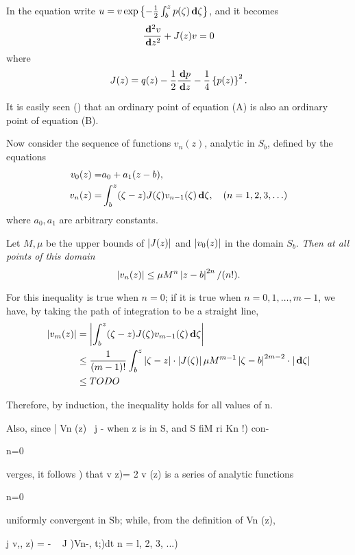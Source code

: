 In the equation write
$u = v \exp \left\{ 
  - \frac{1}{2} \int_{b}^{z} p(\zeta) \, \mathbf{d} \zeta
 \right\}$,
and it becomes
\begin{equation}
  \frac{\, \mathbf{d}^{2} v}{\, \mathbf{d} z^{2}}
  + J(z) v
  = 0
\end{equation}
where
$$
J(z)
=
q(z)
- \frac{1}{2} \frac{\, \mathbf{d} p}{\, \mathbf{d} z}
- \frac{1}{4} \left\{ p(z) \right\}^{2}.
$$
%
%

It is easily seen () that an ordinary point of equation (A) %
is also an ordinary point of equation (B). %

Now consider the sequence of functions $v_{n}(z)$, analytic in $S_{b}$,
defined by the equations
\begin{align*}
  v_{0}(z)
  =& a_{0} + a_{1} (z-b),
  \\
  v_{n}(z)
  =&
  \int_{b}^{z} (\zeta - z) J(\zeta) v_{n-1}(\zeta) \, \mathbf{d} \zeta,
  \quad
  (n=1,2,3,\ldots)
\end{align*}
where $a_{0}, a_{1}$ are arbitrary constants.

Let $M, \mu$ be the upper bounds of $\left| J(z) \right|$ and $\left| v_{0}(z) \right|$ in the domain
$S_{b}$. \emph{Then at all points of this domain}
$$
\left| v_{n}(z) \right|
\leq
\mu M^{n} \left| z-b \right|^{2n} / (n!).
$$

For this inequality is true when $n=0$; if it is true when $n=0,1,\ldots,m-1$,
we have, by taking the path of integration to be a straight
line,
\begin{align*}
  \left| v_{m}(z) \right|
  &=
  \left| 
    \int_{b}^{z} (\zeta-z) J(\zeta) v_{m-1}(\zeta) \, \mathbf{d} \zeta
   \right|
  \\
  &\leq
  \frac{1}{(m-1)!}
  \int_{b}^{z}
  \left| \zeta-z \right| \cdot \left| J(\zeta) \right|
  \mu M^{m-1}
  \left| \zeta-b \right|^{2m-2} \cdot \left| \, \mathbf{d} \zeta \right|
  \\
  &\leq
  TODO
\end{align*}

Therefore, by induction, the inequality holds for all values of n.

Also, since | Vn (z) \ j - when z is in S, and S fiM ri Kn !) con-

    n=0

verges, it follows ) that v z)= 2 v (z) is a series of analytic
functions

n=0

uniformly convergent in Sb; while, from the definition of Vn (z),

j v,, z) = - ~ J \;)Vn-, t;)dt n = l, 2, 3, ...)

